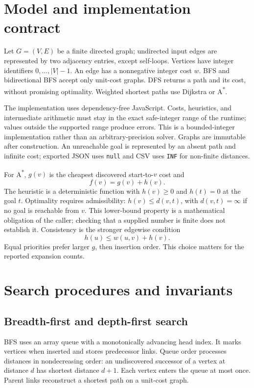 \documentclass[11pt,a4paper]{article}
\newcommand{\astar}{A\textsuperscript{*}}
\begin{document}
\section{Model and implementation contract}
Let $G=(V,E)$ be a finite directed graph; undirected input edges are represented by two adjacency entries, except self-loops. Vertices have integer identifiers $0,\ldots,|V|-1$. An edge has a nonnegative integer cost $w$. BFS and bidirectional BFS accept only unit-cost graphs. DFS returns a path and its cost, without promising optimality. Weighted shortest paths use Dijkstra or \astar.

The implementation uses dependency-free JavaScript. Costs, heuristics, and intermediate arithmetic must stay in the exact safe-integer range of the runtime; values outside the supported range produce errors. This is a bounded-integer implementation rather than an arbitrary-precision solver. Graphs are immutable after construction. An unreachable goal is represented by an absent path and infinite cost; exported JSON uses \texttt{null} and CSV uses \texttt{INF} for non-finite distances.

For \astar, $g(v)$ is the cheapest discovered start-to-$v$ cost and
\begin{equation}
 f(v)=g(v)+h(v).
\end{equation}
The heuristic is a deterministic function with $h(v)\geq0$ and $h(t)=0$ at the goal $t$. Optimality requires admissibility: $h(v)\leq d(v,t)$, with $d(v,t)=\infty$ if no goal is reachable from $v$. This lower-bound property is a mathematical obligation of the caller; checking that a supplied number is finite does not establish it. Consistency is the stronger edgewise condition
\begin{equation}
 h(u)\leq w(u,v)+h(v).
\end{equation}
Equal priorities prefer larger $g$, then insertion order. This choice matters for the reported expansion counts.

\section{Search procedures and invariants}
\subsection{Breadth-first and depth-first search}
BFS uses an array queue with a monotonically advancing head index. It marks vertices when inserted and stores predecessor links. Queue order processes distances in nondecreasing order: an undiscovered successor of a vertex at distance $d$ has shortest distance $d+1$. Each vertex enters the queue at most once. Parent links reconstruct a shortest path on a unit-cost graph.
\end{document}

